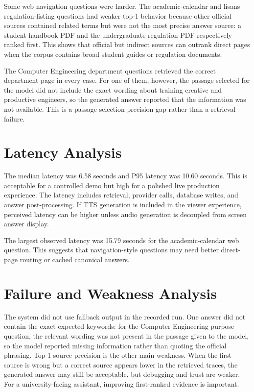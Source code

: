 Some web navigation questions were harder. The academic-calendar and lisans regulation-listing questions had weaker top-1 behavior because other official sources contained related terms but were not the most precise answer source: a student handbook PDF and the undergraduate regulation PDF respectively ranked first. This shows that official but indirect sources can outrank direct pages when the corpus contains broad student guides or regulation documents.

The Computer Engineering department questions retrieved the correct department page in every case. For one of them, however, the passage selected for the model did not include the exact wording about training creative and productive engineers, so the generated answer reported that the information was not available. This is a passage-selection precision gap rather than a retrieval failure.

\section{Latency Analysis}

The median latency was 6.58 seconds and P95 latency was 10.60 seconds. This is acceptable for a controlled demo but high for a polished live production experience. The latency includes retrieval, provider calls, database writes, and answer post-processing. If TTS generation is included in the viewer experience, perceived latency can be higher unless audio generation is decoupled from screen answer display.

The largest observed latency was 15.79 seconds for the academic-calendar web question. This suggests that navigation-style questions may need better direct-page routing or cached canonical answers.

\section{Failure and Weakness Analysis}

The system did not use fallback output in the recorded run. One answer did not contain the exact expected keywords: for the Computer Engineering purpose question, the relevant wording was not present in the passage given to the model, so the model reported missing information rather than quoting the official phrasing. Top-1 source precision is the other main weakness. When the first source is wrong but a correct source appears lower in the retrieved traces, the generated answer may still be acceptable, but debugging and trust are weaker. For a university-facing assistant, improving first-ranked evidence is important.

